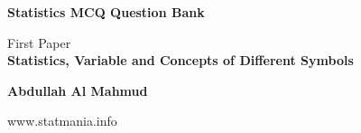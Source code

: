 \documentclass{exam}
\begin{document}
\begin{titlepage}
    \begin{center}
        \vspace*{1cm}
            
        \Huge
        \textbf{Statistics MCQ Question Bank}
            
        \vspace{0.5cm}
        \LARGE
        First Paper \\
         \textbf{Statistics, Variable and Concepts of Different Symbols}
            
        \vspace{1.5cm}
            
        \textbf{Abdullah Al Mahmud}
            
        \vfill
            
            
        \vspace{0.8cm}
            
            
        \Large
        www.statmania.info\\
            
    \end{center}
\end{titlepage}
\end{document}
